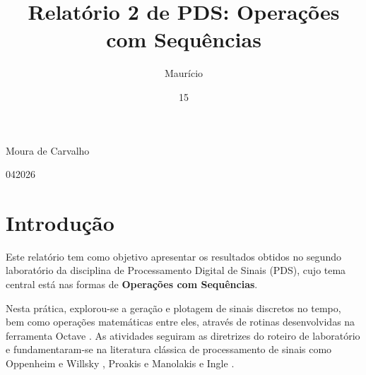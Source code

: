\documentclass[tcc]{classe_uftex/uftex}
\begin{document}
  \title{Relatório 2 de PDS: Operações com Sequências}
  \author{Maurício}{Moura de Carvalho}

  
  \date{15}{04}{2026}
  

  
  \maketitle
  \frontmatter

  \tableofcontents 
  
  \mainmatter
  \setcounter{page}{1} %
  \onehalfspacing


\chapter{Introdução}

Este relatório tem como objetivo apresentar os resultados obtidos no segundo laboratório da disciplina de Processamento Digital de Sinais (PDS), cujo tema central está nas formas de \textbf{Operações com Sequências}.

Nesta prática, explorou-se a geração e plotagem de sinais discretos no tempo, bem como operações matemáticas entre eles, através de rotinas desenvolvidas na ferramenta Octave \cite{octaveman}. As atividades seguiram as diretrizes do roteiro de laboratório \cite{roteiro02} e fundamentaram-se na literatura clássica de processamento de sinais como Oppenheim e Willsky \cite{oppenheim_willsky}, Proakis e Manolakis \cite{proakis_manolakis} e Ingle \cite{ingle2017}.
\end{document}
